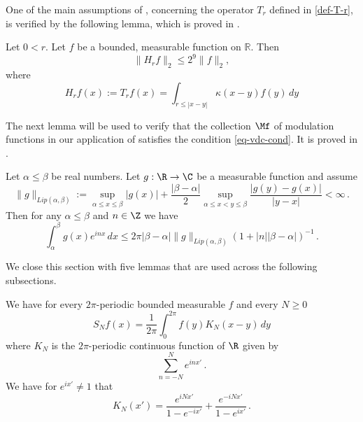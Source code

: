One of the main assumptions of , concerning the operator $T_r$ defined in \eqref{def-T-r}, is verified by the following lemma, which is proved in .
\begin{lemma}
    \label{Hilbert-strong-2-2}
    \leanok
    Let $0<r$. Let $f$ be a bounded, measurable function on $\mathbb{R}$. Then
    \begin{equation}
        \label{eq-Hr-L2-bound}
        \|H_rf\|_{2}\leq 2^{9} \|f\|_2,
    \end{equation}
    where
    \begin{equation}
        \label{def-H-r}
        H_r f(x) := T_r f(x) = \int_{r\le |x-y|} \kappa(x-y) f(y) \, dy
    \end{equation}
\end{lemma}

The next lemma will be used to verify that the collection $\Mf$ of modulation functions in our application of  satisfies the condition \eqref{eq-vdc-cond}.
It is proved in .

\begin{lemma}
\label{van-der-Corput}
\leanok
{}
    Let $\alpha\le\beta$ be real numbers. Let $g:\R\to \C$ be a measurable function and assume
    \begin{equation}
        \|g\|_{Lip(\alpha,\beta)}:=\sup_{\alpha\le x\le \beta}|g(x)|+\frac{|\beta-\alpha|}{2}
        \sup_{\alpha\le x<y\le \beta} \frac {|g(y)-g(x)|}{|y-x|}<\infty\, .
    \end{equation}
    Then for any $\alpha \le \beta$ and $n\in\Z$ we have
    \begin{equation}
        \int _{\alpha}^{\beta} g(x) e^{inx}\, dx\le 2\pi |\beta-\alpha|\|g\|_{Lip(\alpha,\beta)}(1+|n||\beta-\alpha|)^{-1}\, .
    \end{equation}

\end{lemma}


We close this section with five lemmas that are used
across the following subsections.

\begin{lemma}
\label{Dirichlet-kernel}
\leanok
{}
We have for every $2\pi$-periodic bounded measurable $f$ and every $N\ge 0$
\begin{equation}
    S_Nf(x)=\frac 1{2\pi}\int_{0}^{2\pi}f(y) K_N(x-y)\, dy
\end{equation}
where $K_N$ is the $2\pi$-periodic continuous function of
$\R$ given by
\begin{equation}\label{eqksumexp}
\sum_{n=-N}^N e^{in x'}\, .
\end{equation}
We have for $e^{ix'}\neq 1$ that
\begin{equation}\label{eqksumhil}
    K_N(x')=\frac{e^{iNx'}}{1-e^{-ix'}}
      +\frac {e^{-iNx'}}{1-e^{ix'}} \, .
\end{equation}


\end{lemma}


